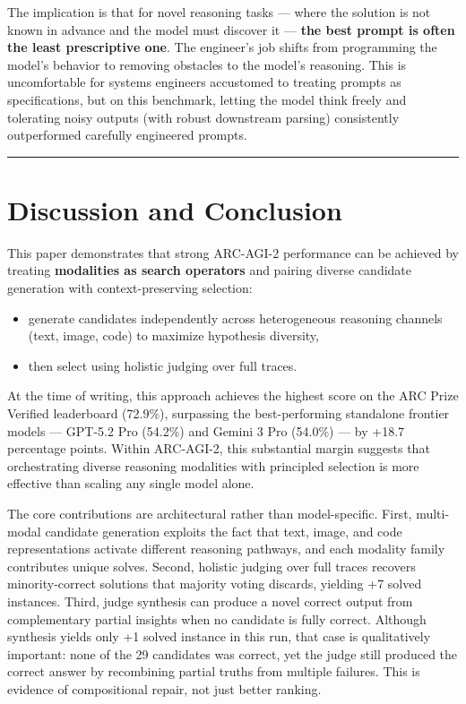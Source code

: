 \documentclass[11pt]{article}
\providecommand{\tightlist}{%
  \setlength{\itemsep}{0pt}\setlength{\parskip}{0pt}}
\begin{document}
The implication is that for novel reasoning tasks --- where the solution
is not known in advance and the model must discover it --- \textbf{the
best prompt is often the least prescriptive one}. The engineer's job
shifts from programming the model's behavior to removing obstacles to
the model's reasoning. This is uncomfortable for systems engineers
accustomed to treating prompts as specifications, but on this benchmark,
letting the model think freely and tolerating noisy outputs (with robust
downstream parsing) consistently outperformed carefully engineered
prompts.

\begin{center}\rule{0.5\linewidth}{0.5pt}\end{center}

\hypertarget{discussion-and-conclusion}{%
\section{Discussion and Conclusion}\label{discussion-and-conclusion}}

This paper demonstrates that strong ARC-AGI-2 performance can be
achieved by treating \textbf{modalities as search operators} and pairing
diverse candidate generation with context-preserving selection:

\begin{itemize}
\tightlist
\item
  generate candidates independently across heterogeneous reasoning
  channels (text, image, code) to maximize hypothesis diversity,
\item
  then select using holistic judging over full traces.
\end{itemize}

At the time of writing, this approach achieves the highest score on the
ARC Prize Verified leaderboard (72.9\%), surpassing the best-performing
standalone frontier models --- GPT-5.2 Pro (54.2\%) and Gemini 3 Pro
(54.0\%) --- by +18.7 percentage points. Within ARC-AGI-2, this
substantial margin suggests that orchestrating diverse reasoning
modalities with principled selection is more effective than scaling any
single model alone.

The core contributions are architectural rather than model-specific.
First, multi-modal candidate generation exploits the fact that text,
image, and code representations activate different reasoning pathways,
and each modality family contributes unique solves. Second, holistic
judging over full traces recovers minority-correct solutions that
majority voting discards, yielding +7 solved instances. Third, judge
synthesis can produce a novel correct output from complementary partial
insights when no candidate is fully correct. Although synthesis yields
only +1 solved instance in this run, that case is qualitatively
important: none of the 29 candidates was correct, yet the judge still
produced the correct answer by recombining partial truths from multiple
failures. This is evidence of compositional repair, not just better
ranking.
\end{document}
